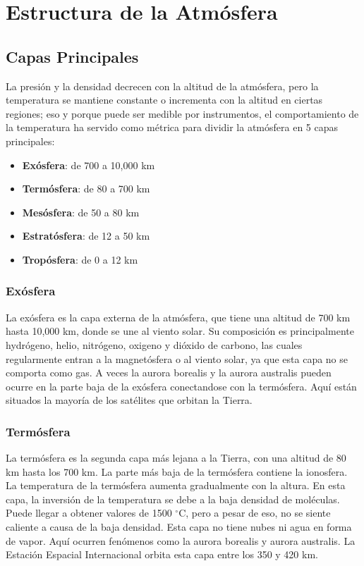 \documentclass{article}
\begin{document}
\section{Estructura de la Atmósfera}
\subsection{Capas Principales}
La presión y la densidad decrecen con la altitud de la atmósfera, pero la temperatura se mantiene constante o incrementa con la altitud en ciertas regiones; eso y porque puede ser medible por instrumentos, el comportamiento de la temperatura ha servido como métrica para dividir la atmósfera en 5 capas principales:

\begin{itemize}
\item  \textbf{Exósfera}: de 700 a 10,000 km
\item \textbf{Termósfera}: de 80 a 700 km
\item \textbf{Mesósfera}: de 50 a 80 km
\item \textbf{Estratósfera}: de 12 a 50 km
\item \textbf{Tropósfera}: de 0 a 12 km
\end{itemize}
\subsubsection{Exósfera}
La exósfera es la capa externa de la atmósfera, que tiene una altitud de 700 km hasta 10,000 km, donde se une al viento solar. Su composición es principalmente hydrógeno, helio, nitrógeno, oxigeno y dióxido de carbono, las cuales regularmente entran a la magnetósfera o al viento solar, ya que esta capa no se comporta como gas. A veces la aurora borealis y la aurora australis pueden ocurre en la parte baja de la exósfera conectandose con la termósfera. Aquí están situados la mayoría de los satélites que orbitan la Tierra.
\subsubsection{Termósfera}
La termósfera es la segunda capa más lejana a la Tierra, con una altitud de 80 km hasta los 700 km. La parte más baja de la termósfera contiene la ionosfera. 
La temperatura de la termósfera aumenta gradualmente con la altura. En esta capa, la inversión de la temperatura se debe a la baja densidad de moléculas. Puede llegar a obtener valores de 1500 $^\circ$C, pero a pesar de eso, no se siente caliente a causa de la baja densidad. Esta capa no tiene nubes ni agua en forma de vapor. Aquí ocurren fenómenos como la aurora borealis y aurora australis. La Estación Espacial Internacional orbita esta capa entre los 350 y 420 km.
\end{document}
